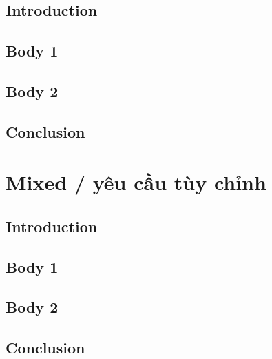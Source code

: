 \documentclass[11pt,a4paper]{article}
\begin{document}
\subsection*{Introduction}
\vspace{1cm}
\subsection*{Body 1}
\vspace{1cm}
\subsection*{Body 2}
\vspace{1cm}
\subsection*{Conclusion}
\vspace{1cm}
\clearpage
\section*{Mixed / yêu cầu tùy chỉnh}
\subsection*{Introduction}
\vspace{1cm}
\subsection*{Body 1}
\vspace{1cm}
\subsection*{Body 2}
\vspace{1cm}
\subsection*{Conclusion}
\vspace{1cm}
\clearpage
\end{document}

